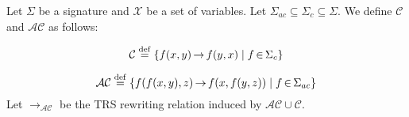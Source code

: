 \documentclass{book}
\begin{document}





 
\begin{definition}
  \label{def:trs:ac}
  Let $\Sigma$ be a signature and $\mathcal{X}$ be a set of variables.
  Let $\Sigma_{ac} \mathop{\subseteq} \Sigma_{c} \mathop{\subseteq} \Sigma$. We define $\mathcal{C}$ and $\mathcal{AC}$ as follows:
  
  $$\mathcal{C} \overset{\operatorname{def}}{=} \{f(x,y) \mathop{\to} f(y,x) \mid f \mathop{\in} \Sigma_{c} \}$$
  
  $$\mathcal{AC} \overset{\operatorname{def}}{=} 
           \{f(f(x,y),z) \mathop{\to} f(x,f(y,z)) \mid f \mathop{\in} \Sigma_{ac} \}$$
  Let $ \mathop{\to} _\mathcal{AC}$ be the TRS rewriting relation induced by $\mathcal{AC} \mathop{\cup} \mathcal{C}$.
\end{definition}
\end{document}
